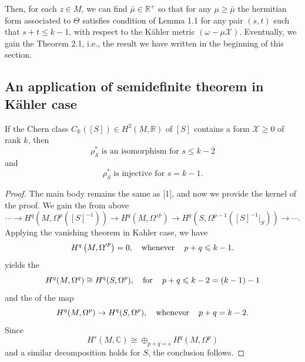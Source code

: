 \documentclass[lang=en,12pt]{beautybook}
\begin{document}
Then, for each $z \in M$, we can find $\bar{\mu} \in \mathbb{R}^+$ so
that for any $\mu \geqslant \bar{\mu}$ the hermitian form associated to
$\Theta$ satisfies condition of Lemma 1.1 for any pair $(s, t)$ such that $s +
  t \leqslant k - 1$, with respect to the K\"ahler metric $(\omega - \mu
  \mathcal{X})$.  Eventually, we gain the Theorem 2.1, i.e., the result we have written in the beginning of this section.

\subsection{An application of semidefinite theorem in K\"ahler case}

\begin{theorem}
  If the Chern class $C_{\mathbb{R}} ([S]) \in H^2 (M, \mathbb{R})$ of $[S]$
  contains a form $\mathcal{X} \geqslant 0$ of rank $k$, then
  \[ \rho^{\ast}_S  \text{ is an isomorphism for $s \leqslant k - 2$} \]
  and
  \[ \rho^{\ast}_S \text{ is injective for $s = k - 1$.} \]
\end{theorem}

\begin{proof}
  The main body remains the same as [1], and now we provide the kernel of the
  proof. We gain the {} from above
  \[ \cdots \rightarrow H^q (M, \Omega^p ([S]^{- 1})) \rightarrow H^q \left(
    {M, \Omega'}^p \right) \rightarrow H^q (S, \Omega^{p - 1} ([S]^{- 1} |_S
    )) \rightarrow \cdots . \]
  Applying the vanishing theorem in Kahler case, we have
  \[ H^q \left( {M, \Omega'}^p \right) = 0, \quad \operatorname{whenever} \quad p + q
    \leqslant k - 1. \]
  {} yields the
    {}
  \begin{equation}
    H^q (M, \Omega^q) \cong H^q (S, \Omega^p), \quad \operatorname{for} \quad p + q
    \leqslant k - 2 = (k - 1) - 1 \label{5}
  \end{equation}
  and the {} of the map
  \[ H^q (M, \Omega^p) \rightarrow H^q (S, \Omega^p), \quad \operatorname{whenever}
    \quad p + q = k - 2. \]
  Since
  \[ H^s (M, \mathbb{C}) \cong \oplus_{p + q = s} H^q (M, \Omega^p) \]
  and a similar decomposition holds for $S$, the conclusion follows.
\end{proof}
\end{document}
